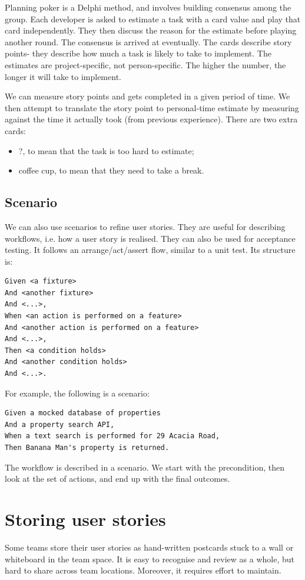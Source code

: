 \documentclass[a4paper, openany]{memoir}
\begin{document}
Planning poker is a Delphi method, and involves building consensus among the group. Each developer is asked to estimate a task with a card value and play that card independently. They then discuss the reason for the estimate before playing another round. The consensus is arrived at eventually. The cards describe story points- they describe how much a task is likely to take to implement. The estimates are project-specific, not person-specific. The higher the number, the longer it will take to implement.

We can measure story points and gets completed in a given period of time. We then attempt to translate the story point to personal-time estimate by measuring against the time it actually took (from previous experience). There are two extra cards:
\begin{itemize}
    \item ?, to mean that the task is too hard to estimate;
    \item coffee cup, to mean that they need to take a break.
\end{itemize}

\subsection{Scenario}
We can also use scenarios to refine user stories. They are useful for describing workflows, i.e. how a user story is realised. They can also be used for acceptance testing. It follows an arrange/act/assert flow, similar to a unit test. Its structure is:
\begin{verbatim}
Given <a fixture>
And <another fixture>
And <...>,
When <an action is performed on a feature>
And <another action is performed on a feature>
And <...>,
Then <a condition holds>
And <another condition holds>
And <...>.
\end{verbatim}
For example, the following is a scenario:
\begin{verbatim}
Given a mocked database of properties
And a property search API,
When a text search is performed for 29 Acacia Road,
Then Banana Man's property is returned.
\end{verbatim}
The workflow is described in a scenario. We start with the precondition, then look at the set of actions, and end up with the final outcomes.

\section{Storing user stories}
Some teams store their user stories as hand-written postcards stuck to a wall or whiteboard in the team space. It is easy to recognise and review as a whole, but hard to share across team locations. Moreover, it requires effort to maintain.
\end{document}
